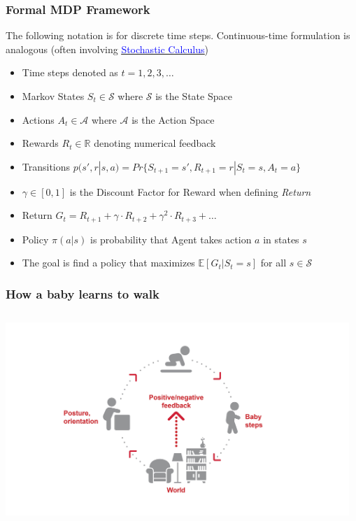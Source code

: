 \documentclass[handout]{beamer}
\begin{document}
\begin{frame}
\frametitle{Formal MDP Framework}
The following notation is for discrete time steps. Continuous-time formulation is analogous (often involving
\href{https://github.com/coverdrive/technical-documents/blob/master/finance/cme241/StochasticCalculusFoundations.pdf}{\underline{\textcolor{blue}{Stochastic Calculus}}})
\pause
\begin{itemize}[<+->]
\item Time steps denoted as $t = 1, 2, 3, \ldots$
\item Markov States $S_t \in \mathcal{S}$ where $\mathcal{S}$ is the State Space
\item Actions $A_t \in \mathcal{A}$ where $\mathcal{A}$ is the Action Space
\item Rewards $R_t \in \mathbb{R}$ denoting numerical feedback\
\item Transitions $p(s',r|s,a) = Pr\{S_{t+1}=s',R_{t+1}=r|S_t=s,A_t=a\}$
\item $\gamma \in [0,1]$ is the Discount Factor for Reward when defining {\em Return}
\item Return $G_t = R_{t+1} + \gamma \cdot R_{t+2} + \gamma^2 \cdot R_{t+3} + \ldots$
\item Policy $\pi(a|s)$ is probability that Agent takes action $a$ in states $s$
\item The goal is find a policy that maximizes  $\mathbb{E}[G_t|S_t = s]$ for all $s \in \mathcal{S}$
\end{itemize}
\end{frame}

\begin{frame}
\frametitle{How a baby learns to walk}
\includegraphics[width=13cm, height=8cm]{BabyMDP.jpg}
\end{frame}
\end{document}
